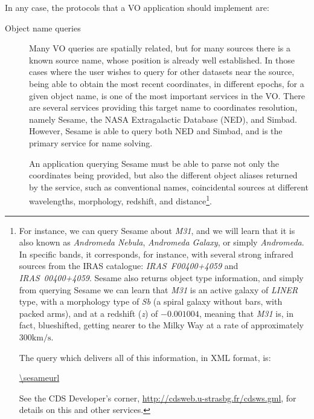 		 In any case, the protocols that a VO application should
		implement are:

		\begin{description}
			\item[Object name queries] Many VO queries are
			spatially related, but for many sources there is a
			known source name, whose position is already well
			established. In those cases where the user wishes to
			query for other datasets near the source, being able to
			obtain the most recent coordinates, in different
			epochs, for a given object name, is one of the most
			important services in the VO.  There are
			several services providing this target name to
			coordinates resolution, namely Sesame, the NASA
			Extragalactic Database (NED), and Simbad. However,
			Sesame is able to query both NED and Simbad, and is the
			primary service for name solving.
			
			 \newcommand{\cdssesamenote}[0]{ For instance, we can
			query Sesame about \emph{M31}, and we will learn that
			it is also known as \emph{Andromeda Nebula},
			\emph{Andromeda Galaxy}, or simply \emph{Andromeda}. In
			specific bands, it corresponds, for instance, with
			several strong infrared sources from the IRAS
			catalogue: \emph{IRAS~F00400+4059} and
			\emph{IRAS~00400+4059}. Sesame also returns object type
			information, and simply from querying Sesame we can
			learn that \emph{M31} is an active galaxy of
			\emph{LINER} type, with a morphology type of \emph{Sb}
			(a spiral galaxy without bars, with packed arms), and
			at a redshift (\emph{z}) of $-0.001004$, meaning that
			\emph{M31} is, in fact, blueshifted, getting nearer to
			the Milky Way at a rate of approximately $300
			\mathrm{km}/\mathrm{s}$.
			
			 The query which delivers all of this information, in
			XML format, is:
			
			 \noindent\url{\sesameurl}
		
			 See the CDS Developer's corner,
			\url{http://cdsweb.u-strasbg.fr/cdsws.gml}, for details
			on this and other services. }
			
			 An application querying Sesame must be able to parse
			not only the coordinates being provided, but also the
			different object aliases returned by the service, such
			as conventional names, coincidental sources at
			different wavelengths, morphology, redshift, and
			distance\footnote{\cdssesamenote}.
			

\end{description}
